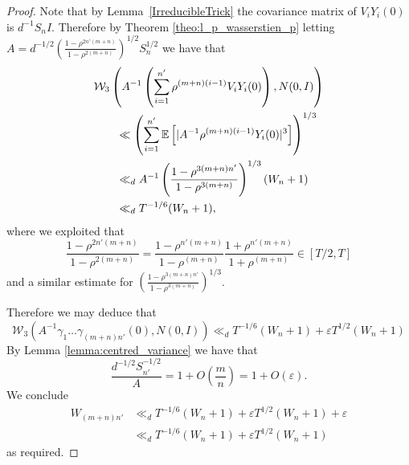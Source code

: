 \documentclass[10pt, english,oneside,reqno]{amsart}
\theoremstyle{plain}
\theoremstyle{remark}
\numberwithin{equation}{section}
\numberwithin{figure}{section}
\begin{document}
\begin{proof}
	Note that by Lemma~\ref{IrreducibleTrick} the covariance matrix of $V_iY_i(0)$ is $d^{-1}S_n I$. Therefore by Theorem \ref{theo:l_p_wasserstien_p} letting $A= d^{-1/2} \left( \frac{1 - \rho^{2 n' (m+n) } }{1 - \rho^{2(m+n)}} \right)^{1/2} S_n^{1/2}$ we have that
	\begin{align*}
	\MoveEqLeft \mathcal{W}_3 \left( A^{-1}  \left( \sum_{i=1}^{n'}\rho^{(m+n)(i-1)} V_i Y_i(0) \right), N(0, I) \right) \\ & \ll \left( \sum_{i=1}^{n'} \mathbb{E} \left[ |A^{-1} \rho^{ (m+n)(i-1)} Y_i(0)|^3 \right] \right)^{1/3} \\
	&\ll_d A^{-1} \left( \frac{1 - \rho^{3 (m+n) n'}}{1 - \rho^{3(m+n)}} \right)^{1/3} (W_n + 1) \\
    & \ll_d T^{-1/6} (W_n+1),
	\end{align*} where we exploited that $$\frac{1 - \rho^{2 n' (m+n) } }{1 - \rho^{2(m+n)}} = \frac{1 - \rho^{n' (m+n) } }{1 - \rho^{(m+n)}}\frac{1 + \rho^{ n' (m+n) } }{1 + \rho^{(m+n)}} \in [T/2,T]$$ and a similar estimate for $\left( \frac{1 - \rho^{3 (m+n) n'}}{1 - \rho^{3(m+n)}} \right)^{1/3}$.
	
	Therefore we may deduce that
	\begin{equation*}
	\mathcal{W}_3 \left( A^{-1} \gamma_1 \dots \gamma_{(m+n) n'} (0), N(0, I) \right) \ll_d T^{-1/6} (W_n + 1) + \varepsilon T^{1/2} (W_n + 1)
	\end{equation*}
	By Lemma \ref{lemma:centred_variance} we have that
	\begin{equation*}
	\frac{d^{-1/2} S_{n'}^{-1/2}}{A} = 1 + O(\frac{m}{n}) = 1 + O(\varepsilon).
	\end{equation*}
	We conclude
	\begin{align*}
		W_{(m+n) n'} &\ll_d T^{-1/6} (W_n + 1) + \varepsilon T^{1/2} (W_n + 1) + \varepsilon \\
		&\ll_d T^{-1/6} (W_n + 1) + \varepsilon T^{1/2} (W_n + 1)
	\end{align*}
	as required.
\end{proof}
\end{document}
